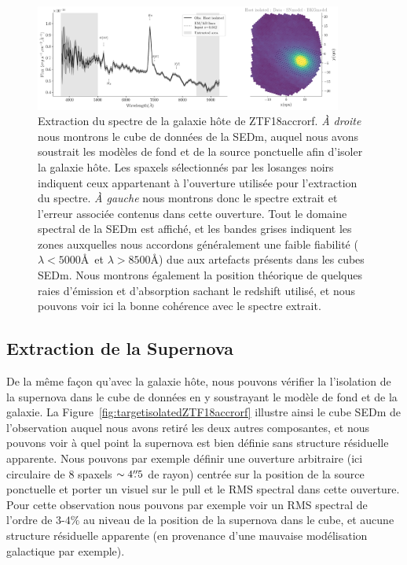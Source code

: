 \documentclass[../main/main.tex]{subfiles}
\begin{document}
\begin{figure}[ht]
  \centering
  \includegraphics[width=0.9\textwidth]{../figures/07_scene/output_host_ZTF18accrorf.pdf}
  \caption[Extraction du spectre de la galaxie hôte de
  ZTF18accrorf]{Extraction du spectre de la galaxie hôte de
    ZTF18accrorf. \emph{À droite} nous montrons le cube de données de la
  SEDm, auquel nous avons soustrait les modèles de fond et de la source
  ponctuelle afin d'isoler la galaxie hôte. Les spaxels sélectionnés par
les losanges noirs indiquent ceux appartenant à l'ouverture utilisée
pour l'extraction du spectre. \emph{À gauche} nous montrons donc le
spectre extrait et l'erreur associée contenus dans cette ouverture. Tout le domaine spectral
de la SEDm est affiché, et les bandes grises indiquent les zones
auxquelles nous accordons généralement une faible fiabilité ($\lambda<5000$\AA\ et
$\lambda>8500$\AA) due aux artefacts
présents dans les cubes SEDm. Nous montrons également la position
théorique de quelques raies d'émission et d'absorption sachant le
redshift utilisé, et nous pouvons voir ici la bonne cohérence avec le
spectre extrait.}
  \label{fig:hostspecZTF18accrorf}
\end{figure}

\subsection{Extraction de la Supernova}

De la même façon qu'avec la galaxie hôte, nous pouvons vérifier la
l'isolation de la supernova dans le cube de données en y soustrayant le
modèle de fond et de la galaxie. La
Figure~\ref{fig:targetisolatedZTF18accrorf} illustre ainsi le cube SEDm
de l'observation auquel nous avons retiré les deux autres composantes,
et nous pouvons voir à quel point la supernova est bien définie sans
structure résiduelle apparente. Nous pouvons par exemple définir une
ouverture arbitraire (ici circulaire de $8$ spaxels $\sim4\overset{\prime\prime}{.}5$ de
rayon) centrée sur la position de la source ponctuelle et porter un
visuel sur le pull et le RMS spectral dans cette ouverture. Pour cette
observation nous pouvons par exemple voir un RMS spectral de l'ordre de
$3$-$4\%$ au niveau de la position de la supernova dans le cube, et
aucune structure résiduelle apparente (en provenance d'une mauvaise
modélisation galactique par exemple).
\end{document}

